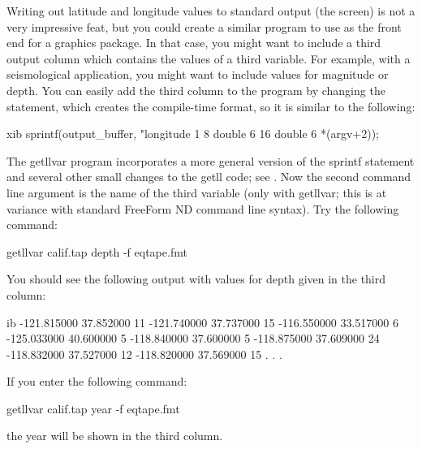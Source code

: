 Writing out latitude and longitude values to standard output (the
screen) is not a very impressive feat, but you could create a similar
program to use as the front end for a graphics package. In that case,
you might want to include a third output column which contains the
values of a third variable. For example, with a seismological
application, you might want to include values for magnitude or depth.
You can easily add the third column to the  program by
changing the  statement, which creates the compile-time
format, so it is similar to the following:

\begin{vcode}{xib}
sprintf(output_buffer, 
        "longitude 1 8 double 6 16 double 6\n %
        *(argv+2)); 
\end{vcode}

The getllvar program incorporates a more general version of the
sprintf statement and several other small changes to the getll code;
see . Now the second command line argument is the name
of the third variable (only with getllvar; this is at variance with
standard FreeForm ND command line syntax). Try the following command:

\begin{example}
getllvar calif.tap depth -f eqtape.fmt 
\end{example}

You should see the following output with values for depth given in the
third column:

\begin{vcode}{ib}
-121.815000     37.852000          11
-121.740000     37.737000          15
-116.550000     33.517000           6
-125.033000     40.600000           5
-118.840000     37.600000           5
-118.875000     37.609000          24
-118.832000     37.527000          12
-118.820000     37.569000          15
     .
     .
     . 
\end{vcode}

If you enter the following command: 

\begin{example}
getllvar calif.tap year -f eqtape.fmt 
\end{example}

the year will be shown in the third column. 

